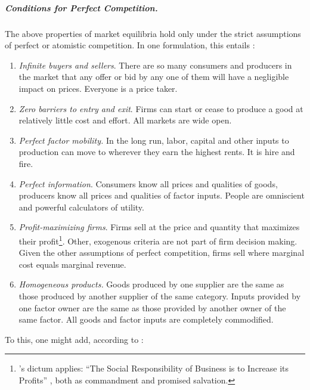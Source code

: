 \subparagraph[Perfect Competition]{Conditions for Perfect Competition.}  \label{sec:perfect-competition} The above properties of market equilibria hold only under the strict assumptions of perfect or atomistic competition. In one formulation, this entails \citep[157f]{McDowell2006}: 
\begin{enumerate}
	\item \emph{Infinite buyers and sellers}.\label{it:infinite-buyers-sellers} There are so many consumers and producers in the market that any offer or bid by any one of them will have a negligible impact on prices. Everyone is a price taker.
	\item \emph{Zero barriers to entry and exit}. \label{it:easy-entry-exit} 
		Firms can start or cease to produce a good at relatively little cost and effort. All markets are wide open. 
	\item \emph{Perfect factor mobility.} \label{it:perfect-factor-mobility} 
		In the long run, labor, capital and other inputs to production can move to wherever they earn the highest rents. It is hire and fire.
	\item \emph{Perfect information}. \label{it:perfect-information} 
		Consumers know all prices and qualities of goods, producers know all prices and qualities of factor inputs. People are omniscient and powerful calculators of utility.
	\item \emph{Profit-maximizing firms}. \label{it:profit-maximizing-firms} 
		Firms sell at the price and quantity that maximizes their profit\footnote{
			\citeauthor{Friedman1970a}'s dictum applies: ``The Social Responsibility of Business is to Increase its Profits'' \citeyearpar{Friedman1970a}, both as commandment and promised salvation.}.
		Other, exogenous criteria are not part of firm decision making. Given the other assumptions of perfect competition, firms sell where marginal cost equals marginal revenue.
	\item \emph{Homogeneous products.}\label{it:homogeneous-products}
		Goods produced by one supplier are the same as those produced by another supplier of the same category. Inputs provided by one factor owner are the same as those provided by another owner of the same factor. All goods and factor inputs are completely commodified. 
\end{enumerate} 
To this, one might add, according to \citeauthor{Wikipedia2012}:
